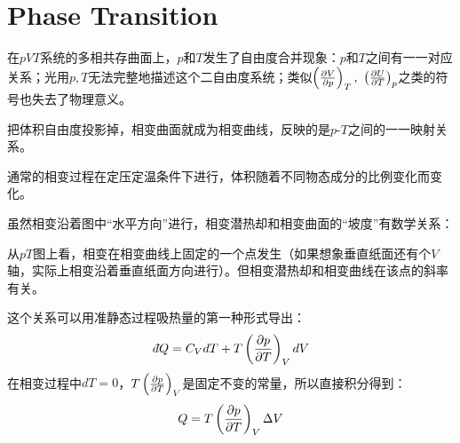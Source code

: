 \documentclass[CJK]{beamer}
\begin{document}
\section{Phase Transition}


\begin{frame}
\bch

在$pVT$系统的多相共存曲面上，$p$和$T$发生了自由度合并现象：$p$和$T$之间有一一对应关系；光用$p, T$无法完整地描述这个二自由度系统；类似$\left(\frac{\partial V}{\partial p}\right)_{T},\ \left(\frac{\partial U}{\partial T}\right)_{p}$之类的符号也失去了物理意义。

\ech
\end{frame}



\begin{frame}
\bchL
把体积自由度投影掉，相变曲面就成为相变曲线，反映的是$p$-$T$之间的一一映射关系。

\echL
\end{frame}

\begin{frame}
\bchL
通常的相变过程在定压定温条件下进行，体积随着不同物态成分的比例变化而变化。
\echL
\end{frame}


\begin{frame}
\bchL
虽然相变沿着图中“水平方向”进行，相变潜热却和相变曲面的“坡度”有数学关系：
\echL
\end{frame}


\begin{frame}
\bch
从$pT$图上看，相变在相变曲线上固定的一个点发生（如果想象垂直纸面还有个$V$轴，实际上相变沿着垂直纸面方向进行）。但相变潜热却和相变曲线在该点的斜率有关。
\ech
\end{frame}

\begin{frame}
\bchL
这个关系可以用准静态过程吸热量的第一种形式导出：
$$\dbar Q = C_V dT + T\pfrac pTV dV $$
在相变过程中$dT=0$，$T\left(\frac{\partial p}{\partial T}\right)_{V}$是固定不变的常量，所以直接积分得到：
$$ Q = T\left(\frac{\partial p}{\partial T}\right)_{V} \Delta V $$
\echL
\end{frame}
\end{document}
